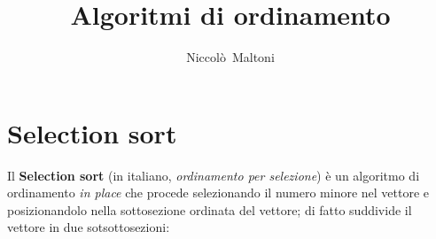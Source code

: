 \onehalfspacing{}             %

\setcounter{secnumdepth}{3}   %
\setcounter{tocdepth}{3}      %

\usepackage[%
  depth=3,            %
  open=false,         %
  numbered=true       %
]{bookmark}                   %
\usepackage{hyperref}         %

\usepackage[a-1b]{pdfx}
\usepackage[%
  italian,            %
  nameinlink          %
]{cleveref}                   %

\title{\LARGE{\textbf{Algoritmi di ordinamento}}}

\author{Niccolò~Maltoni}

\date{}



  \maketitle
  \clearpage

  \section{Selection sort}\label{sec:selection}

  Il \textbf{Selection sort} (in italiano, \textit{ordinamento per selezione})
  è un algoritmo di ordinamento \textit{in place} che procede selezionando il numero minore nel vettore
  e posizionandolo nella sottosezione ordinata del vettore;
  di fatto suddivide il vettore in due sotsottosezioni:

